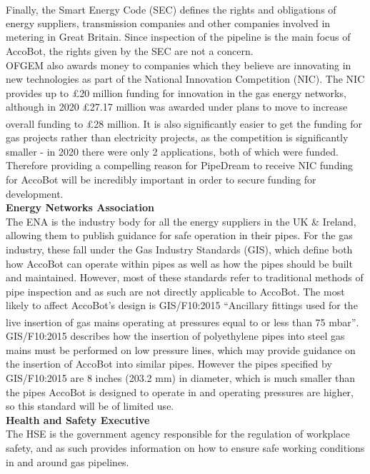\documentclass[11pt]{article}		%
\newcommand{\supercite}[1]{\textsuperscript{\cite{#1}}}		%
\begin{document}
			\\
			Finally, the Smart Energy Code (SEC)\supercite{smart2021smart} defines the rights and obligations of energy suppliers, transmission companies and other companies involved in metering in Great Britain.
			Since inspection of the pipeline is the main focus of AccoBot, the rights given by the SEC are not a concern.
			\\
			OFGEM also awards money to companies which they believe are innovating in new technologies as part of the National Innovation Competition (NIC).
			The NIC provides up to £20 million funding for innovation in the gas energy networks, although in 2020 £27.17 million was awarded under plans to move to increase overall funding to £28 million\supercite{ofgem2020nic}.
			It is also significantly easier to get the funding for gas projects rather than electricity projects, as the competition is significantly smaller - in 2020 there were only 2 applications, both of which were funded.
			Therefore providing a compelling reason for PipeDream to receive NIC funding for AccoBot will be incredibly important in order to secure funding for development.
			\\
			\textbf{Energy Networks Association}
			\\
			The ENA is the industry body for all the energy suppliers in the UK \& Ireland, allowing them to publish guidance for safe operation in their pipes.
			For the gas industry, these fall under the Gas Industry Standards (GIS), which define both how AccoBot can operate within pipes as well as how the pipes should be built and maintained.
			However, most of these standards refer to traditional methods of pipe inspection and as such are not directly applicable to AccoBot.
			The most likely to affect AccoBot's design is GIS/F10:2015 “Ancillary fittings used for the live insertion of gas mains operating at pressures equal to or less than 75 mbar”\supercite{energy2015gas}.
			GIS/F10:2015 describes how the insertion of polyethylene pipes into steel gas mains must be performed on low pressure lines, which may provide guidance on the insertion of AccoBot into similar pipes.
			However the pipes specified by 	GIS/F10:2015 are 8 inches (203.2 mm) in diameter, which is much smaller than the pipes AccoBot is designed to operate in and operating pressures are higher, so this standard will be of limited use.
			\\
			\textbf{Health and Safety Executive}
			\\
			The HSE is the government agency responsible for the regulation of workplace safety, and as such provides information on how to ensure safe working conditions in and around gas pipelines.
\end{document}
